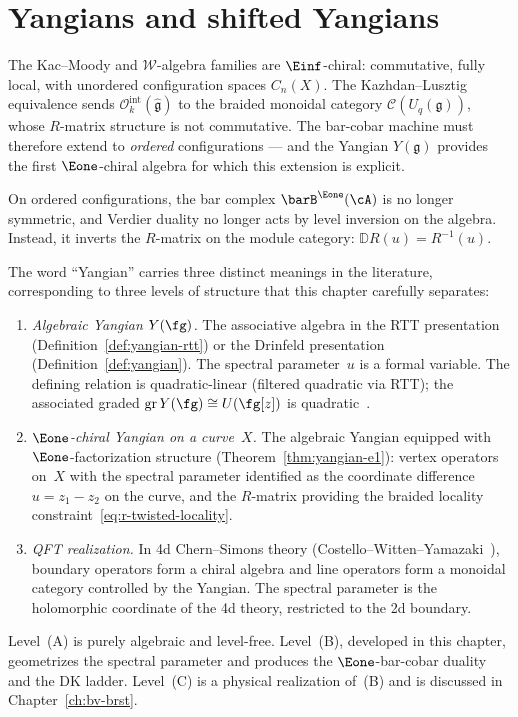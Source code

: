 \chapter{Yangians and shifted Yangians}
\label{chap:yangians}
\label{rem:yangian-status}


The Kac--Moody and $\mathcal{W}$-algebra families are
$\Einf$-chiral: commutative, fully local, with unordered
configuration spaces $C_n(X)$.  The Kazhdan--Lusztig equivalence
\cite{KL93}
sends $\mathcal{O}_k^{\mathrm{int}}(\widehat{\mathfrak{g}})$ to the
braided monoidal category $\mathcal{C}(U_q(\mathfrak{g}))$, whose
$R$-matrix structure is not commutative.  The bar-cobar machine must
therefore extend to \emph{ordered} configurations --- and the Yangian
$Y(\mathfrak{g})$ provides the first $\Eone$-chiral algebra for which
this extension is explicit.

On ordered configurations, the bar complex $\barB^{\Eone}(\cA)$
is no longer symmetric, and Verdier duality no longer acts by level
inversion on the algebra.  Instead, it inverts the $R$-matrix on
the module category: $\mathbb{D} R(u) = R^{-1}(u)$.

\begin{remark}
\label{rem:yangian-three-levels}
The word ``Yangian'' carries three distinct meanings in the
literature, corresponding to three levels of structure that this
chapter carefully separates:
\begin{enumerate}[label=\textup{(\Alph*)}]
\item \emph{Algebraic Yangian $Y(\fg)$.}
  The associative algebra in the RTT presentation
  (Definition~\ref{def:yangian-rtt}) or the Drinfeld presentation
  (Definition~\ref{def:yangian}).  The spectral parameter~$u$ is a
  formal variable.  The defining relation is
  quadratic-linear (filtered quadratic via RTT);
  the associated graded
  $\operatorname{gr} Y(\fg) \cong U(\fg[z])$ is
  quadratic~\cite{Drinfeld85,molev-yangians}.
\item \emph{$\Eone$-chiral Yangian on a curve~$X$.}
  The algebraic Yangian equipped with $\Eone$-factorization structure
  (Theorem~\ref{thm:yangian-e1}): vertex operators on~$X$ with
  the spectral parameter identified as the coordinate difference
  $u = z_1 - z_2$ on the curve, and the $R$-matrix providing the
  braided locality constraint~\eqref{eq:r-twisted-locality}.
\item \emph{QFT realization.}
  In 4d Chern--Simons theory (Costello--Witten--Yamazaki~\cite{CWY18}),
  boundary operators form a chiral algebra and line operators form
  a monoidal category controlled by the Yangian.  The spectral
  parameter is the holomorphic coordinate of the 4d theory,
  restricted to the 2d boundary.
\end{enumerate}
Level~(A) is purely algebraic and level-free.
Level~(B), developed in this chapter, geometrizes the spectral
parameter and produces the $\Eone$-bar-cobar duality and the DK
ladder.  Level~(C) is a physical realization of~(B) and is
discussed in Chapter~\ref{ch:bv-brst}.
\end{remark}

